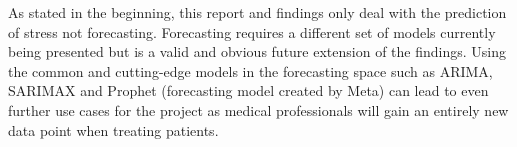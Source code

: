 \documentclass{article}
\begin{document}
As stated in the beginning, this report and findings only deal with the prediction of stress not forecasting. Forecasting requires a different set of models currently being presented but is a valid and obvious future extension of the findings. Using the common and cutting-edge models in the forecasting space such as ARIMA, SARIMAX and Prophet \cite{prophet23} (forecasting model created by Meta) can lead to even further use cases for the project as medical professionals will gain an entirely new data point when treating patients.



\end{document}
